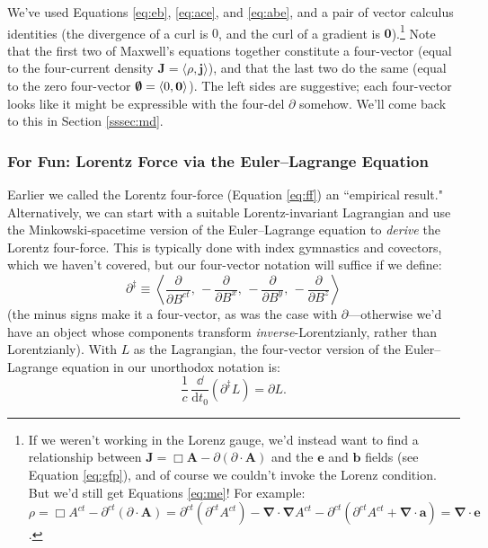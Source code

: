 \documentclass[12pt]{article}
\renewcommand{\vv}[1]{\mathbf{#1}}
\newcommand{\dd}[1]{\mathrm{d}#1}
\newcommand{\del}{\boldsymbol{\nabla}}
\begin{document}
We've used Equations \ref{eq:eb}, \ref{eq:ace}, and \ref{eq:abe}, and a pair of vector calculus identities (the divergence of a curl is $0$, and the curl of a gradient is $\vv 0$).\footnote{If we weren't working in the Lorenz gauge, we'd instead want to find a relationship between $\vv J = \Box \vv A - \partialup (\partialup \cdot \vv A)$ and the $\vv e$ and $\vv b$ fields (see Equation \ref{eq:gfp}), and of course we couldn't invoke the Lorenz condition. But we'd still get Equations \ref{eq:me}! For example: $\rho = \Box A^{ct} - \partial^{ct}(\partialup \cdot \vv A) = \partial^{ct} (\partial^{ct} A^{ct}) - \del \cdot \del A^{ct} - \partial^{ct} (\partial^{ct} A^{ct} + \del \cdot \vv a) = \del \cdot \vv e$.} Note that the first two of Maxwell's equations together constitute a four-vector (equal to the four-current density $\vv J = \langle \rho, \vv j \rangle$), and that the last two do the same (equal to the zero four-vector $\textrm{\mbox{\boldmath $\emptyset$}} = \langle 0, \vv 0 \rangle$). The left sides are suggestive; each four-vector looks like it might be expressible with the four-del $\partialup$ somehow. We'll come back to this in Section \ref{sssec:md}.


\subsubsection{For Fun: Lorentz Force via the Euler--Lagrange Equation}

Earlier we called the Lorentz four-force (Equation \ref{eq:ff}) an ``empirical result." Alternatively, we can start with a suitable Lorentz-invariant Lagrangian and use the Minkowski-spacetime version of the Euler--Lagrange equation to \emph{derive} the Lorentz four-force. This is typically done with index gymnastics and covectors, which we haven't covered, but our four-vector notation will suffice if we define:
\begin{equation*}
\partialup^\ddagger \equiv \left \langle \dfrac{\partial}{\partial B^{ct}} , \,  - \dfrac{\partial}{\partial B^x} , \, - \dfrac{\partial}{\partial B^y} , \, - \dfrac{\partial}{\partial B^z} \right \rangle
\end{equation*}
(the minus signs make it a four-vector, as was the case with $\partialup$---otherwise we'd have an object whose components transform \emph{inverse}-Lorentzianly, rather than Lorentzianly). With $L$ as the Lagrangian, the four-vector version of the Euler--Lagrange equation in our unorthodox notation is:
\begin{equation*}
\dfrac{1}{c} \, \dfrac{\dd}{\dd t_0} \left( \partialup^\ddagger L \right) = \partialup L .
\end{equation*}
\end{document}
